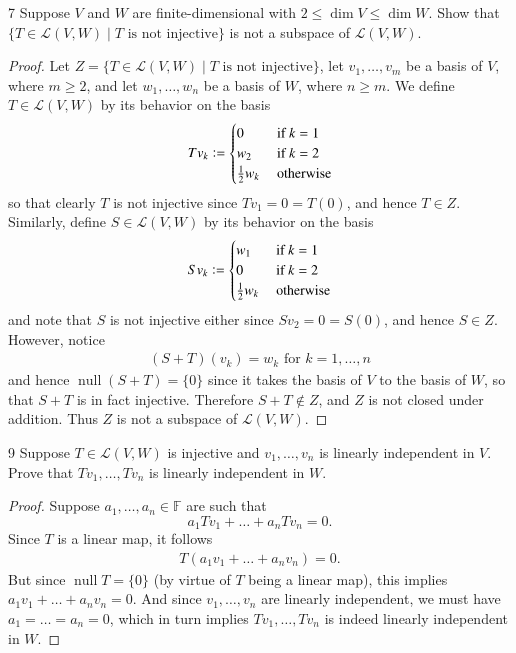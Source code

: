 \documentclass{extarticle}
\newenvironment{problem}[1]{\begin{prob*}{#1}{}}{\end{prob*}}
\newcommand{\F}{\mathbb{F}}
\newcommand{\Hom}{\mathcal{L}}
\DeclareMathOperator{\Null}{null}
\newcommand{\defeq}{\vcentcolon=}
\begin{document}
\begin{problem}{7}
Suppose $V$ and $W$ are finite-dimensional with $2\leq \dim V\leq \dim W$.  Show that $\{T\in \Hom(V,W)\mid T \text{ is not injective}\}$ is not a subspace of $\Hom(V,W)$.
\end{problem}
\begin{proof}
Let $Z = \{T\in \Hom(V,W)\mid T \text{ is not injective}\}$, let $v_1,\dots, v_m$ be a basis of $V$, where $m\geq 2$, and let $w_1,\dots, w_n$ be a basis of $W$, where $n\geq m$.  We define $T\in \Hom(V,W)$ by its behavior on the basis
\begin{equation*}
Tv_k \defeq \begin{cases}0 &\text{ if }k = 1\\ w_2 &\text{ if }k = 2 \\ \frac{1}{2}w_{k} &\text{ otherwise}\end{cases}
\end{equation*}
so that clearly $T$ is not injective since $Tv_1 = 0 = T(0)$, and hence $T\in Z$.  Similarly, define $S\in\Hom(V,W)$ by its behavior on the basis
\begin{equation*}
Sv_k \defeq \begin{cases}w_1 &\text{ if }k = 1\\0 &\text{ if }k = 2\\ \frac{1}{2}w_{k} &\text{ otherwise}\end{cases}
\end{equation*}
and note that $S$ is not injective either since $Sv_2 = 0 = S(0)$, and hence $S\in Z$.  However, notice
\begin{align*}
(S+ T)(v_k) = w_k \text{ for } k = 1,\dots, n
\end{align*}
and hence $\Null(S+T)=\{0\}$ since it takes the basis of $V$ to the basis of $W$, so that $S+T$ is in fact injective.  Therefore $S+T\not\in Z$, and $Z$ is not closed under addition.  Thus $Z$ is not a subspace of $\Hom(V,W)$.
\end{proof}

\begin{problem}{9}
Suppose $T\in\Hom(V,W)$ is injective and $v_1,\dots, v_n$ is linearly independent in $V$.  Prove that $Tv_1,\dots, Tv_n$ is linearly independent in $W$.  
\end{problem}
\begin{proof}
Suppose $a_1,\dots, a_n\in\F$ are such that 
\begin{equation*}
a_1Tv_1 + \dots + a_nTv_n = 0.
\end{equation*}
Since $T$ is a linear map, it follows
\begin{align*}
T(a_1v_1 + \dots + a_nv_n) = 0.
\end{align*}
But since $\Null T = \{0\}$ (by virtue of $T$ being a linear map), this implies $a_1v_1 + \dots + a_nv_n= 0$.  And since $v_1,\dots, v_n$ are linearly independent, we must have $a_1=\dots = a_n = 0$, which in turn implies $Tv_1,\dots, Tv_n$ is indeed linearly independent in $W$.  
\end{proof}
\end{document}

